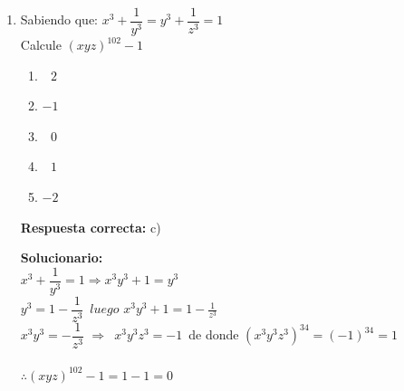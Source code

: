 \begin{enumerate}[resume]
	
	\item Sabiendo que:
	${x^3} + \dfrac{1}{{{y^3}}} = {y^3} + \dfrac{1}{{{z^3}}} = 1$\\
	Calcule $(xyz)^{102}-1$
	
	
	\begin{enumerate}[label=\alph*)]
		\item $\,\,\,\,2$
		\item $-1$
		\item $\,\,\,\,0$
		\item $\,\,\,\,1$
		\item $-2$
	\end{enumerate}
	
	\textbf{Respuesta correcta:} c)
	
	\vspace{2mm}
	\textbf{Solucionario:}\\
	
	${x^3} + \dfrac{1}{{{y^3}}} = 1 \Rightarrow {x^3}{y^3} + 1 = {y^3}$\\
	${y^3} = 1 - \dfrac{1}{{{z^3}}}\,\,\,luego\,\,{x^3}{y^3} + 1 = 1 - \frac{1}{{{z^3}}}$\\
	${x^3}{y^3} =  - \dfrac{1}{{{z^3}}}\,\, \Rightarrow \,\,\,{x^3}{y^3}{z^3} =  - 1$\	de donde ${\left( {{x^3}{y^3}{z^3}} \right)^{34}} = {\left( { - 1} \right)^{34}} = 1$\\\\
	$\therefore {(xyz)^{102}} - 1 = 1 - 1 = 0$
	
	
\end{enumerate}


